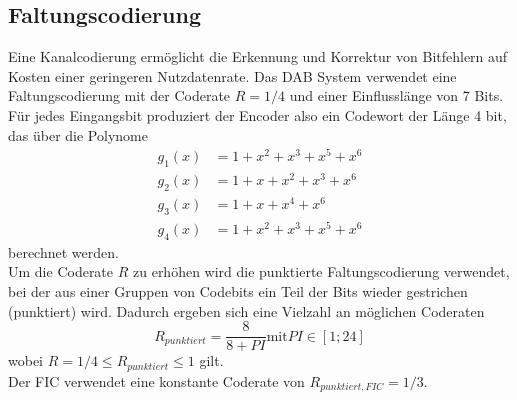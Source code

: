 \subsection{Faltungscodierung}
Eine Kanalcodierung ermöglicht die Erkennung und Korrektur von Bitfehlern auf Kosten einer geringeren Nutzdatenrate. Das DAB System verwendet eine Faltungscodierung mit der Coderate $R=1/4$ und einer Einflusslänge von 7 Bits. Für jedes Eingangsbit produziert der Encoder also ein Codewort der Länge 4 bit, das über die Polynome
\begin{equation}
\begin{aligned}
g_1(x) &= 1 + x^2 + x^3 + x^5 + x^6 \\
g_2(x) &= 1 + x + x^2 + x^3 + x^6 \\
g_3(x) &= 1 + x + x^4 + x^6 \\
g_4(x) &= 1 + x^2 + x^3 + x^5 + x^6
\end{aligned}
\end{equation}
berechnet werden. \\
Um die Coderate $R$ zu erhöhen wird die punktierte Faltungscodierung verwendet, bei der aus einer Gruppen von Codebits ein Teil der Bits wieder gestrichen (punktiert) wird. Dadurch ergeben sich eine Vielzahl an möglichen Coderaten
\begin{equation}
R_{punktiert} = \frac{8}{8 + PI} \text{mit} PI \in [1;24]
\end{equation}
wobei $R = 1/4 \leq R_{punktiert} \leq 1$ gilt.\\
Der FIC verwendet eine konstante Coderate von $R_{punktiert, FIC} = 1/3$.


\begin{figure}
\begin{center}
\end{center}
\end{figure}


